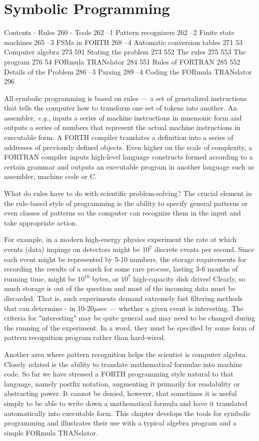 \documentclass{book}
\begin{document}
\dominitoc
\tableofcontents
\chapter{Symbolic Programming}
\minitoc

Contents
- Rules 260
- Tools 262
--1 Pattern recognizers 262
--2 Finite state machines 265
--3 FSMs in FORTH 268
--4 Automatic conversion tables 271
53 Computer algebra 273
591 Stating the problem 273
552 The rules 275
553 The program 276
54 FORmula TRANslator 284
551 Rules of FORTRAN 285
552 Details of the Problem 286
--3 Parsing 289
--4 Coding the FORmula TRANslator 296

All symbolic programming is based on rules --- a set of generalized instructions that tells the computer how to transform one set of tokens into another. An assembler, \textit{e.g.}, inputs a series of machine instructions in mnemonic form and outputs a series of numbers that represent the actual machine instructions in executable form. A FORTH compiler translates a definition into a series of addresses of previously defined objects. Even higher on the scale of complexity, a FORTRAN compiler inputs high-level language constructs formed according to a certain grammar and outputs an executable program in another language such as assembler, machine code or C.

What do rules have to do with scientific problem-solving? The crucial element in the rule-based style of programming is the ability to specify general patterns or even classes of patterns so the computer can recognize them in the input and take appropriate action.

For example, in a modern high-energy physics experiment the rate at which events (data) impinge on detectors might be $10^{7}$ discrete events per second. Since each event might be represented by 5-10 numbers, the storage requirements for recording the results of a search for some rare process, lasting 3-6 months of running time, might be $10^16$ bytes, or $10^7$ high-capacity disk drives! Clearly, so much storage is out of the question and most of the incoming data must be discarded. That is, such experiments demand extremely fast filtering methods that can determine - in 10-20$\mu$sec — whether a given event is interesting. The criteria for "interesting" may be quite general and may need to be changed during the running of the experiment. In a word, they must be specified by some form of pattern recognition program rather than hard-wired.

Another area where pattern recognition helps the scientist is computer algebra. Closely related is the ability to translate mathematical formulae into machine code. So far we have stressed a FORTH programming style natural to that language, namely postfix notation, augmenting it primarily for readability or abstracting power. It cannot be denied, however, that sometimes it is useful simply to be able to write down a mathematical formula and have it translated automatically into executable form. This chapter develops the tools for symbolic programming and illustrates their use with a typical algebra program and a simple FORmula TRANslator.
\end{document}
